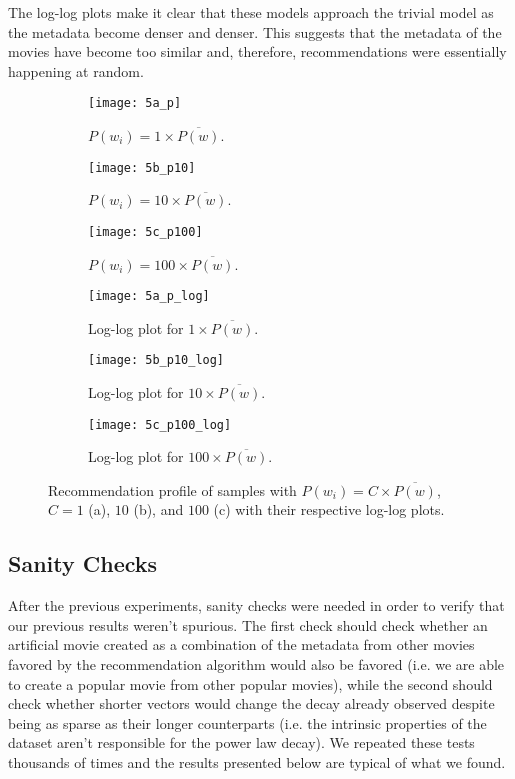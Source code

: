 The log-log plots make it clear that these models approach the trivial model as
the metadata become denser and denser. This suggests that the metadata of the
movies have become too similar and, therefore, recommendations were essentially
happening at random.

\begin{figure}
  \centering
  \begin{subfigure}{0.3\textwidth}
    \centering
    \texttt{[image: 5a\_p]}
    \caption{$P(w_{i}) = 1 \times \overline{P(w)}$.\label{fig:fig5a}}
  \end{subfigure}
  \begin{subfigure}{0.3\textwidth}
    \centering
    \texttt{[image: 5b\_p10]}
    \caption{$P(w_{i}) = 10 \times \overline{P(w)}$.\label{fig:fig5b}}
  \end{subfigure}
  \begin{subfigure}{0.3\textwidth}
    \centering
    \texttt{[image: 5c\_p100]}
    \caption{$P(w_{i}) = 100 \times \overline{P(w)}$.\label{fig:fig5c}}
  \end{subfigure}
  \begin{subfigure}{0.3\textwidth}
    \centering
    \texttt{[image: 5a\_p\_log]}
    \caption{Log-log plot for $1 \times \overline{P(w)}$.\label{fig:fig5a}}
  \end{subfigure}
  \begin{subfigure}{0.3\textwidth}
    \centering
    \texttt{[image: 5b\_p10\_log]}
    \caption{Log-log plot for $10 \times \overline{P(w)}$.\label{fig:fig5b}}
  \end{subfigure}
  \begin{subfigure}{0.3\textwidth}
    \centering
    \texttt{[image: 5c\_p100\_log]}
    \caption{Log-log plot for $100 \times \overline{P(w)}$.\label{fig:fig5c}}
  \end{subfigure}
  \caption{Recommendation profile of samples with
    $P(w_{i}) = C \times \overline{P(w)}$, $C = 1$ (a), $10$ (b), and $100$
    (c) with their respective log-log plots.\label{fig:fig5}}
\end{figure}

\subsection{Sanity Checks}
\label{subsec:sanity03}

After the previous experiments, sanity checks were needed in order to verify
that our previous results weren't spurious. The first check should check whether
an artificial movie created as a combination of the metadata from other movies
favored by the recommendation algorithm would also be favored (i.e. we are able
to create a popular movie from other popular movies), while the second should
check whether shorter vectors would change the decay already observed despite
being as sparse as their longer counterparts (i.e. the intrinsic properties of
the dataset aren't responsible for the power law decay). We repeated these tests
thousands of times and the results presented below are typical of what we found.

